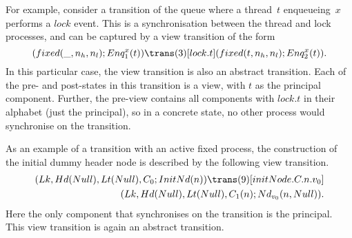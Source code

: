 For example, consider a transition of the queue where a thread~$t$
enqueueing~$x$ performs a $lock$ event.  This is a synchronisation between the
thread and lock processes, and can be captured by a view transition of the
form
%
\begin{equation}
(fixed(\_, n_h, n_l); Enq^x_1(t))  \trans(3)[lock.t]
  (fixed(t, n_h, n_l); Enq^x_2(t)) .
\label{trans:lock}
\end{equation}
%
%
In this particular case, the view transition is also an abstract transition.
Each of the pre- and post-states in this transition is a view, with $t$ as the
principal component.  Further, the pre-view contains all components with
$lock.t$ in their alphabet (just the principal), so in a concrete state, no
other process would synchronise on the transition.


As an example of a transition with an active fixed process, the construction
of the initial dummy header node is described by the following view
transition.
\[
\begin{align}
(\Lock, \Head(Null), \Last(Null), \Con_0; \InitNode(n)) 
  \trans(9)[initNode.C.n.v_0] \\
\qquad (\Lock, \Head(Null), \Last(Null), \Con_1(n); \Node_{v_0}(n, Null)).
\end{align}
\]
Here the only component that synchronises on the transition is the principal.
This view transition is again an abstract transition.

